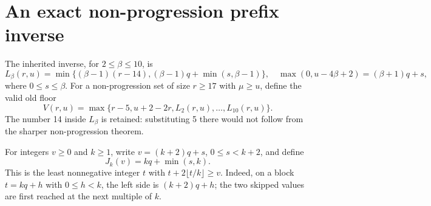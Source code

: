\documentclass[11pt,a4paper]{article}
\begin{document}
\section{An exact non-progression prefix inverse}
The inherited inverse, for $2\le\beta\le10$, is
\[
 L_\beta(r,u)=\min\{(\beta-1)(r-14),
 (\beta-1)q+\min(s,\beta-1)\},
 \quad \max(0,u-4\beta+2)=(\beta+1)q+s,
\]
where $0\le s\le\beta$. For a non-progression set of size $r\ge17$ with
$\mu\ge u$, define the valid old floor
\begin{equation}\label{old}
 V(r,u)=\max\{r-5,u+2-2r,L_2(r,u),\ldots,L_{10}(r,u)\}.
\end{equation}
The number 14 inside $L_\beta$ is retained: substituting 5 there would
not follow from the sharper non-progression theorem.

For integers $v\ge0$ and $k\ge1$, write $v=(k+2)q+s$, $0\le s<k+2$,
and define
\begin{equation}\label{inverse}
 J_k(v)=kq+\min(s,k).
\end{equation}
This is the least nonnegative integer $t$ with
$t+2\lfloor t/k\rfloor\ge v$. Indeed, on a block $t=kq+h$ with
$0\le h<k$, the left side is $(k+2)q+h$; the two skipped values
are first reached at the next multiple of $k$.
\end{document}
